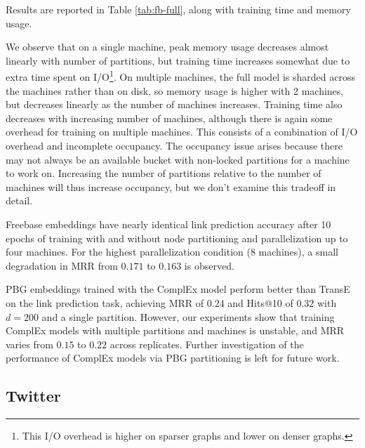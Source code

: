 \documentclass{article}
\begin{document}
Results are reported in Table \ref{tab:fb-full}, along with training time and memory usage.

We observe that on a single machine, peak memory usage decreases almost linearly with number of partitions, but training time increases somewhat due to extra time spent on I/O\footnote{This I/O overhead is higher on sparser graphs and lower on denser graphs.}. On multiple machines, the full model is sharded across the machines rather than on disk, so memory usage is higher with 2 machines, but decreases linearly as the number of machines increases. Training time also decreases with increasing number of machines, although there is again some overhead for training on multiple machines. This consists of a combination of I/O overhead and incomplete occupancy. The occupancy issue arises because there may not always be an available bucket with non-locked partitions for a machine to work on. Increasing the number of partitions relative to the number of machines will thus increase occupancy, but we don't examine this tradeoff in detail.

Freebase embeddings have nearly identical link prediction accuracy after 10 epochs of training with and without node partitioning and parallelization up to four machines.  For the highest parallelization condition (8 machines), a small degradation in MRR from $0.171$ to $0.163$ is observed.

PBG embeddings trained with the ComplEx model perform better than TransE on the link prediction task, achieving MRR of $0.24$ and Hits@10 of $0.32$ with $d=200$ and a single partition. However, our experiments show that training ComplEx models with multiple partitions and machines is unstable, and MRR varies from $0.15$ to $0.22$ across replicates. Further investigation of the performance of ComplEx models via PBG partitioning is left for future work. 









\subsection{Twitter} 
\end{document}
